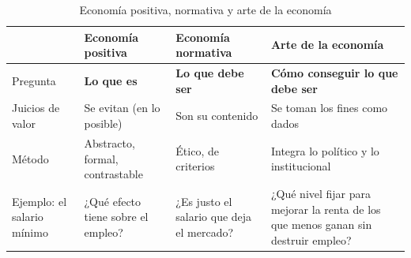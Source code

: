 \documentclass[11pt]{article}
\begin{document}
\begin{table}[H]
\centering
\caption{Economía positiva, normativa y arte de la economía}\label{tab:positiva-normativa}
\small
\begin{tabular}{>{\raggedright\arraybackslash}m{2.6cm}>{\centering\arraybackslash}m{4.0cm}>{\centering\arraybackslash}m{4.0cm}>{\centering\arraybackslash}m{4.0cm}}
\toprule
\rowcolor{tceeazulpalido} & \textbf{Economía positiva} & \textbf{Economía normativa} & \textbf{Arte de la economía}\\
\midrule
Pregunta & \textcolor{tceeazul}{\textbf{Lo que es}} & \textcolor{tceedorado}{\textbf{Lo que debe ser}} & \textcolor{tceeverde}{\textbf{Cómo conseguir lo que debe ser}}\\
\addlinespace[0.3em]
Juicios de valor & Se evitan (en lo posible) & Son su contenido & Se toman los fines como dados\\
\addlinespace[0.3em]
Método & Abstracto, formal, contrastable & Ético, de criterios & Integra lo político y lo institucional\\
\midrule
\cellcolor{tceesalvia}Ejemplo: el salario mínimo & \cellcolor{tceesalvia}¿Qué efecto tiene sobre el empleo? & \cellcolor{tceesalvia}¿Es justo el salario que deja el mercado? & \cellcolor{tceesalvia}¿Qué nivel fijar para mejorar la renta de los que menos ganan sin destruir empleo?\\
\bottomrule
\end{tabular}
\end{table}
\end{document}
